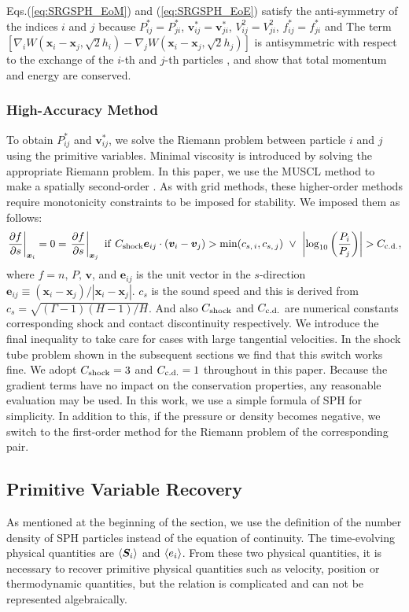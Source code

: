 \documentclass[]{aastex631}
\begin{document}
Eqs.(\ref{eq:SRGSPH_EoM}) and (\ref{eq:SRGSPH_EoE}) satisfy the anti-symmetry of the indices $i$ and $j$ because $P^*_{ij}=P^*_{ji}$, $\bm{v}^*_{ij}=\bm{v}^*_{ji}$, $V^2_{ij}=V^2_{ji}$, $f^*_{ij}=f^*_{ji}$ and 
The term $[ \nabla_i W(\bm{x}_i - \bm{x}_j, \sqrt{2} h_i) - \nabla_j W(\bm{x}_i - \bm{x}_j, \sqrt{2} h_j) ]$ is antisymmetric with respect to the exchange of the $i$-th and $j$-th particles
, and show that total momentum and energy are conserved.

\subsubsection{High-Accuracy Method}
To obtain $P^*_{ij}$ and $\bm{v}^*_{ij}$, we solve the Riemann problem between particle $i$ and $j$ using the primitive variables.
Minimal viscosity is introduced by solving the appropriate Riemann problem.
In this paper, we use the MUSCL method to make a spatially second-order \citep{vanLeer_1979}.
As with grid methods, these higher-order methods require monotonicity constraints to be imposed for stability.
We imposed them as follows:
\begin{align}
\label{eq:monotonicity}
    \left. \frac{\partial f}{\partial s} \right|_{\bm{x}_i}=0=\left. \frac{\partial f}{\partial s} \right|_{\bm{x}_j}\ {\rm if}\ 
    C_{\rm shock} \bm{e}_{ij}\cdot (\bm{v}_i-\bm{v}_j)>\min(c_{s,\,i},c_{s,\,j})\ \vee\ 
    \left| \log_{10}\left(\frac{P_i}{P_j}\right) \right|>C_{\rm c.d.},
\end{align}
where $f=n,\,P,\,\bm{v}$, and $\bm{e}_{ij}$ is the unit vector in the $s$-direction $\bm{e}_{ij}\equiv(\bm{x}_i-\bm{x}_j)/|\bm{x}_i-\bm{x}_j|$.
$c_s$ is the sound speed and this is derived from 
$c_s=\sqrt{(\mathit{\Gamma}-1)(H-1)/H}$.
And also $C_{\rm shock}$ and $C_{\rm c.d.}$ are numerical constants corresponding shock and contact discontinuity respectively.
 We introduce the final inequality to take care for cases with large tangential velocities. In the shock tube problem shown in the subsequent sections we find that this switch works fine.
We adopt $C_{\rm shock}=3$ and $C_{\rm c.d.}=1$ throughout in this paper.
Because the gradient terms have no impact on the conservation properties, any reasonable evaluation may be used. In this work, we use a simple formula of SPH for simplicity.
In addition to this, if the pressure or density becomes negative, we switch to the first-order method for the Riemann problem of the corresponding pair. 

\subsection{Primitive Variable Recovery}
As mentioned at the beginning of the section, we use the definition of the number density of SPH particles instead of the equation of continuity.
The time-evolving physical quantities are $\ev{\bm{S}_i}$ and $\ev{e_i}$.
From these two physical quantities, it is necessary to recover primitive physical quantities such as velocity, position or thermodynamic quantities, but the relation is complicated and can not be represented algebraically.
\end{document}
